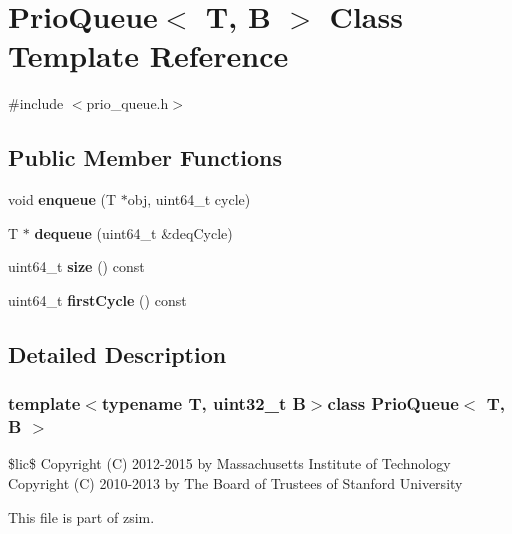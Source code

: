 \hypertarget{classPrioQueue}{\section{Prio\-Queue$<$ T, B $>$ Class Template Reference}
\label{classPrioQueue}
}


{\ttfamily \#include $<$prio\-\_\-queue.\-h$>$}

\subsection*{Public Member Functions}
\begin{DoxyCompactItemize}
\item 
\hypertarget{classPrioQueue_a8106fa16087b97ab98321a16d11a6016}{void {\bfseries enqueue} (T $\ast$obj, uint64\-\_\-t cycle)}\label{classPrioQueue_a8106fa16087b97ab98321a16d11a6016}

\item 
\hypertarget{classPrioQueue_a73dae2219e50b5246b1d4d6218b14c21}{T $\ast$ {\bfseries dequeue} (uint64\-\_\-t \&deq\-Cycle)}\label{classPrioQueue_a73dae2219e50b5246b1d4d6218b14c21}

\item 
\hypertarget{classPrioQueue_a5e1fa977f684d0b268cf6b368c539591}{uint64\-\_\-t {\bfseries size} () const }\label{classPrioQueue_a5e1fa977f684d0b268cf6b368c539591}

\item 
\hypertarget{classPrioQueue_a54194b3751c4b594bb9d1568a0a26749}{uint64\-\_\-t {\bfseries first\-Cycle} () const }\label{classPrioQueue_a54194b3751c4b594bb9d1568a0a26749}

\end{DoxyCompactItemize}


\subsection{Detailed Description}
\subsubsection*{template$<$typename T, uint32\-\_\-t B$>$class Prio\-Queue$<$ T, B $>$}

\$lic\$ Copyright (C) 2012-\/2015 by Massachusetts Institute of Technology Copyright (C) 2010-\/2013 by The Board of Trustees of Stanford University

This file is part of zsim.

